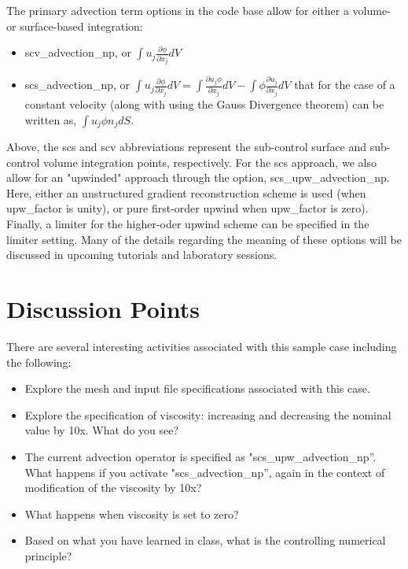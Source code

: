 \documentclass{article}
\begin{document}
The primary advection term options in the code base allow for either a volume- or surface-based integration:
\begin{itemize}
    \item scv\_advection\_np, or $\int u_j \frac{\partial \phi}{\partial x_j} dV$
    \item scs\_advection\_np, or $\int u_j \frac{\partial \phi}{\partial x_j} dV = \int \frac{\partial u_j \phi}{\partial x_j} dV - \int \phi \frac{\partial u_j}{\partial x_j} dV$ that for the case of a constant velocity (along with using the Gauss Divergence theorem) can be written as, $\int u_j \phi n_j dS$.
\end{itemize}
Above, the scs and scv abbreviations represent the sub-control surface and sub-control volume integration points, respectively. For the scs approach, we also allow for an "upwinded" approach through the option, scs\_upw\_advection\_np. Here, either an unstructured gradient reconstruction scheme is used (when upw\_factor is unity), or pure first-order upwind when upw\_factor is zero). Finally, a limiter for the higher-oder upwind scheme can be specified in the limiter setting. Many of the details regarding the meaning of these options will be discussed in upcoming tutorials and laboratory sessions.

\section{Discussion Points}

There are several interesting activities associated with this sample case including
the following:

\begin{itemize}
	\item Explore the mesh and input file specifications associated with this case.
	\item Explore the specification of viscosity: increasing and decreasing the nominal value by 10x. 
          What do you see?
        \item The current advection operator is specified as "scs\_upw\_advection\_np''. What happens if you
          activate "scs\_advection\_np'', again in the context of modification of the viscosity by 10x?
        \item What happens when viscosity is set to zero?
        \item Based on what you have learned in class, what is the controlling numerical principle?
\end{itemize}
\end{document}
